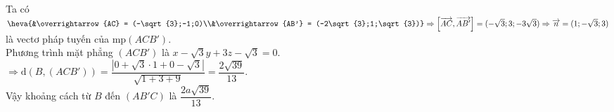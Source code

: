 \begin{ex}
{		Ta có $\heva{&\overrightarrow{AC} =  (-\sqrt{3};-1;0)\\&\overrightarrow{AB'} = (-2\sqrt{3};1;\sqrt{3})} \Rightarrow \left[\overrightarrow{AC}, \overrightarrow{AB'}\right] = (-\sqrt{3};3;-3\sqrt{3}) \Rightarrow \overrightarrow{n}=(1;-\sqrt{3};3)$ là vectơ pháp tuyến của $\mathrm{mp}(ACB')$. \\
		Phương trình mặt phẳng $(ACB')$ là $x-\sqrt{3}y+3z-\sqrt{3}=0$.\\ 
		$\Rightarrow \mathrm{d}\left(B, (ACB')\right)  = \dfrac{\left|0+\sqrt{3}\cdot1+0-\sqrt{3}\right|}{\sqrt{1+3+9}} = \dfrac{2\sqrt{39}}{13}$.\\
		Vậy khoảng cách  từ $B$ đến $(AB'C)$ là $\dfrac{2a\sqrt{39}}{13}$.
	 }
\end{ex}

